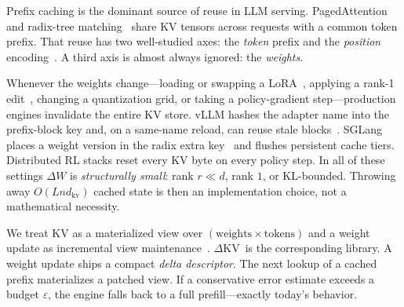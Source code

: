 \documentclass{article}
\newcommand{\dkv}{$\Delta$KV}
\begin{document}
Prefix caching is the dominant source of reuse in LLM serving.
PagedAttention~\citep{kwon2023vllm} and radix-tree matching~\citep{zheng2024sglang}
share KV tensors across requests with a common token prefix.
That reuse has two well-studied axes: the \emph{token} prefix and the
\emph{position} encoding~\citep{su2024rope}.
A third axis is almost always ignored: the \emph{weights}.

Whenever the weights change---loading or swapping a
LoRA~\citep{hu2022lora,dettmers2023qlora}, applying a rank-1
edit~\citep{meng2022rome,meng2023memit}, changing a quantization grid, or
taking a policy-gradient step---production engines invalidate the entire
KV store.
vLLM hashes the adapter name into the prefix-block key and, on a
same-name reload, can reuse stale blocks~\citep{vllm-lora-stale,vllm-rl-rfc}.
SGLang places a weight version in the radix extra
key~\citep{sglang-weight-version} and flushes persistent cache tiers.
Distributed RL stacks reset every KV byte on every policy step.
In all of these settings $\Delta W$ is \emph{structurally small}: rank
$r\ll d$, rank $1$, or KL-bounded.
Throwing away $O(Lnd_{\mathrm{kv}})$ cached state is then an
implementation choice, not a mathematical necessity.

We treat KV as a materialized view over $(\mathrm{weights}\times\mathrm{tokens})$
and a weight update as incremental view
maintenance~\citep{gupta1993ivm}.
\dkv\ is the corresponding library.
A weight update ships a compact \emph{delta descriptor}.
The next lookup of a cached prefix materializes a patched view.
If a conservative error estimate exceeds a budget $\varepsilon$, the
engine falls back to a full prefill---exactly today's behavior.
\end{document}

